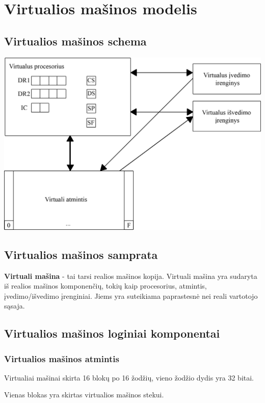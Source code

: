 \section{Virtualios mašinos modelis}
	\subsection{Virtualios mašinos schema}
	\includegraphics{VM1.5.png}
	\subsection{Virtualios mašinos samprata}
	\textbf{Virtuali mašina} - tai tarsi realios mašinos kopija. Virtuali mašina yra sudaryta iš realios mašinos komponenčių, tokių kaip procesorius, atmintis, įvedimo/išvedimo įrenginiai. Jiems yra suteikiama paprastesnė nei reali vartotojo sąsaja.
	
	\subsection{Virtualios mašinos loginiai komponentai}
	\subsubsection{Virtualios mašinos atmintis}
	Virtualiai mašinai skirta 16 blokų po 16 žodžių, vieno žodžio dydis yra 32 bitai.
	
	Vienas blokas yra skirtas virtualios mašinos stekui.
